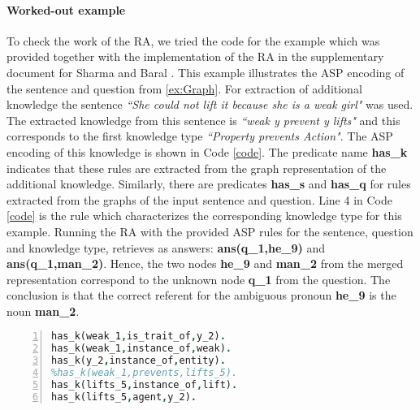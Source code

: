\paragraph{Worked-out example} To check the work of the RA, we tried the code for the example which was provided together with the implementation of the RA in the supplementary document for Sharma and Baral \cite{2018CommonsenseKT}. This example illustrates the ASP encoding of the sentence and question from \ref{ex:Graph}.
For extraction of additional knowledge the sentence \textit{``She could not lift it because she is a weak girl"} was used. The extracted knowledge from this sentence is \textit{``weak y prevent y lifts"} and this corresponds to the first knowledge type \textit{``Property prevents Action"}. The ASP encoding of this knowledge is shown in Code \ref{code}. The predicate name \textbf{has\_k} indicates that these rules are extracted from the graph representation of the additional knowledge. Similarly, there are predicates \textbf{has\_s} and \textbf{has\_q} for rules extracted from the graphs of the input sentence and question. Line 4 in Code \ref{code} is the rule which characterizes the corresponding knowledge type for this example. Running the RA with the provided ASP rules for the sentence, question and knowledge type, retrieves as answers: \textbf{ans(q\_1,he\_9)} and \textbf{ans(q\_1,man\_2)}. Hence, the two nodes \textbf{he\_9} and \textbf{man\_2} from the merged representation correspond to the unknown node \textbf{q\_1} from the question. The conclusion is that the correct referent for the ambiguous pronoun \textbf{he\_9} is the noun \textbf{man\_2}. 

\pagebreak
\begin{lstlisting}[language = Prolog, style=SC, caption={``weak y prevents y lifts"},label=code,numbers=left,
numberstyle=\tiny ]
has_k(weak_1,is_trait_of,y_2).
has_k(weak_1,instance_of,weak).
has_k(y_2,instance_of,entity).
%has_k(weak_1,prevents,lifts_5).
has_k(lifts_5,instance_of,lift).
has_k(lifts_5,agent,y_2).
\end{lstlisting}


